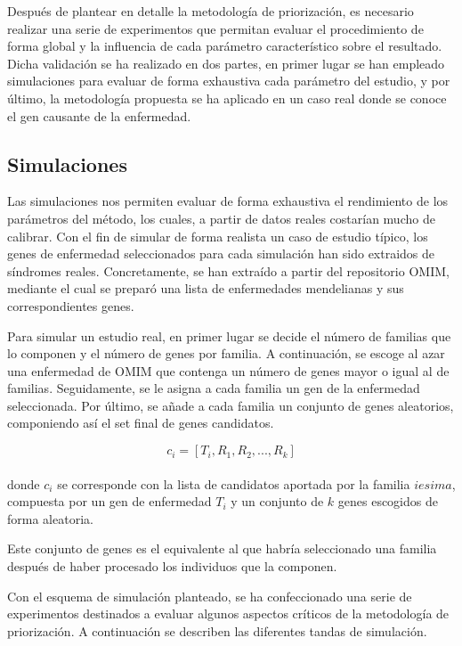 Después de plantear en detalle la metodología de priorización, es necesario realizar una serie de experimentos que permitan evaluar el procedimiento de forma global y la influencia de cada parámetro característico sobre el resultado. Dicha validación se ha realizado en dos partes, en primer lugar se han empleado simulaciones para evaluar de forma exhaustiva cada parámetro del estudio, y por último, la metodología propuesta se ha aplicado en un caso real donde se conoce el gen causante de la enfermedad.

	\subsection{Simulaciones}
	
Las simulaciones nos permiten evaluar de forma exhaustiva el rendimiento de los parámetros del método, los cuales, a partir de datos reales costarían mucho de calibrar. Con el fin de simular de forma realista un caso de estudio típico, los genes de enfermedad seleccionados para cada simulación han sido extraidos de síndromes reales. Concretamente, se han extraído a partir del repositorio OMIM, mediante el cual se preparó una lista de enfermedades mendelianas y sus correspondientes genes. 

\medskip
Para simular un estudio real, en primer lugar se decide el número de familias que lo componen y el número de genes por familia. A continuación, se escoge al azar una enfermedad de OMIM que contenga un número de genes mayor o igual al de familias. Seguidamente, se le asigna a cada familia un gen de la enfermedad seleccionada. Por último, se añade a cada familia un conjunto de genes aleatorios, componiendo así el set final de genes candidatos.

\begin{equation}
 c_i = [T_i,R_1,R_2,...,R_k]
\end{equation}
\\

donde $c_i$ se corresponde con la lista de candidatos aportada por la familia $iesima$, compuesta por un gen de enfermedad $T_i$ y un conjunto de $k$ genes escogidos de forma aleatoria.

\medskip
Este conjunto de genes es el equivalente al que habría seleccionado una familia después de haber procesado los individuos que la componen.

\medskip
Con el esquema de simulación planteado, se ha confeccionado una serie de experimentos destinados a evaluar algunos aspectos críticos de la metodología de priorización. A continuación se describen las diferentes tandas de simulación.

